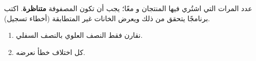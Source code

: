 \begin{statement}
 عدد المرات التي اشتُري فيها المنتجان  و معًا؛ يجب أن تكون المصفوفة \textbf{متناظرة}. اكتب برنامجًا يتحقق من ذلك ويعرض الخانات غير المتطابقة (أخطاء تسجيل).
\end{statement}
\begin{stepsbox}\begin{enumerate}
\item نقارن فقط النصف العلوي  بالنصف السفلي.
\item كل اختلاف خطأ نعرضه.
\end{enumerate}\end{stepsbox}
